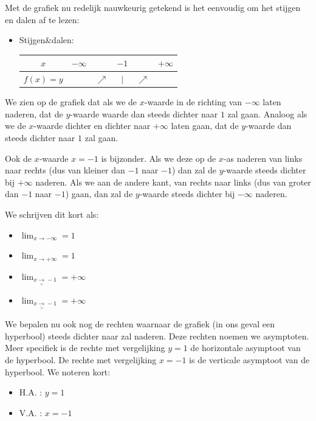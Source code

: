 \documentclass[12pt]{article}
\begin{document}
Met de grafiek nu redelijk nauwkeurig getekend is het eenvoudig om het stijgen en dalen af te lezen:

\begin{itemize}
  \item Stijgen\&dalen:
  \begin{center}
    \begin{tabular}{c|ccccc}
      $x$ & $-\infty$ & & $-1$ & & $+\infty$\\
      \hline
      $f(x)=y$ & & $\nearrow$ & $|$ & $\nearrow$ &
    \end{tabular}
  \end{center}
\end{itemize}

We zien op de grafiek dat als we de $x$-waarde in de richting van $-\infty$ laten naderen, dat de $y$-waarde waarde dan steeds dichter naar $1$ zal gaan. Analoog als we de $x$-waarde dichter en dichter naar $+\infty$ laten gaan, dat de $y$-waarde dan steeds dichter naar $1$ zal gaan.

Ook de $x$-waarde $x=-1$ is bijzonder. Als we deze op de $x$-as naderen van links naar rechts (dus van kleiner dan $-1$ naar $-1$) dan zal de $y$-waarde steeds dichter bij $+\infty$ naderen. Als we aan de andere kant, van rechts naar links (dus van groter dan $-1$ naar $-1$) gaan, dan zal de $y$-waarde steeds dichter bij $-\infty$ naderen.

We schrijven dit kort als:

\begin{itemize}
  \item $\displaystyle\lim_{x\to -\infty}=1$
  \item $\displaystyle\lim_{x\to +\infty}=1$
  \item $\displaystyle\lim_{x\underset{<}{\to} -1}=+\infty$
  \item $\displaystyle\lim_{x\underset{>}{\to} -1}=+\infty$
\end{itemize}

We bepalen nu ook nog de rechten waarnaar de grafiek (in ons geval een hyperbool) steeds dichter naar zal naderen. Deze rechten noemen we asymptoten. Meer specifiek is de rechte met vergelijking $y=1$ de horizontale asymptoot van de hyperbool. De rechte met vergelijking $x=-1$ is de verticale asymptoot van de hyperbool. We noteren kort:

\begin{itemize}
  \item H.A. : $y=1$
  \item V.A. : $x=-1$
\end{itemize}
\end{document}
